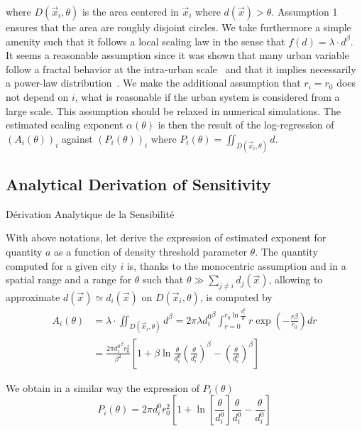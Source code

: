 where $D(\vec{x}_i, \theta)$ is the area centered in $\vec{x}_i$ where $d(\vec{x})>\theta$. Assumption 1 ensures that the area are roughly disjoint circles. We take furthermore a simple amenity such that it follows a local scaling law in the sense that $f(d)=\lambda\cdot d^\beta$. It seems a reasonable assumption since it was shown that many urban variable follow a fractal behavior at the intra-urban scale~\cite{keersmaecker2003using} and that it implies necessarily a power-law distribution~\cite{chen2010characterizing}. We make the additional assumption that $r_i=r_0$ does not depend on $i$, what is reasonable if the urban system is considered from a large scale. This assumption should be relaxed in numerical simulations. The estimated scaling exponent $\alpha(\theta)$ is then the result of the log-regression of $(A_i(\theta))_i$ against $(P_i(\theta))_i$ where $P_i(\theta)=\iint_{D(\vec{x}_i,\theta)}{d}$.


\subsection{Analytical Derivation of Sensitivity}{Dérivation Analytique de la Sensibilité}

With above notations, let derive the expression of estimated exponent for quantity $a$ as a function of density threshold parameter $\theta$. The quantity computed for a given city $i$ is, thanks to the monocentric assumption and in a spatial range and a range for $\theta$ such that $\theta \gg \sum_{j\neq i}{d_j(\vec{x})}$, allowing to approximate $d(\vec{x})\simeq d_i(\vec{x})$ on $D(\vec{x}_i,\theta)$, is computed by
\[
\begin{split}
A_i(\theta) & = \lambda\cdot \iint_{D(\vec{x}_i,\theta)}{d^\beta} = 2\pi\lambda {d_i^0}^{\beta} \int_{r=0}^{r_0 \ln{\frac{d_i^0}{\theta}}}{r\exp{\left(-\frac{r\beta}{r_0}\right)}dr}\\
& = \frac{2\pi {d_i^0}^\beta r_0^2}{\beta^2} \left[1 + \beta \ln{\frac{\theta}{d_i^0}\left(\frac{\theta}{d_i^0}\right)^\beta} - \left(\frac{\theta}{d_i^0}\right)^\beta\right]
\end{split}
\]

We obtain in a similar way the expression of $P_i(\theta)$
\[
P_i(\theta) = 2\pi d_i^0 r_0^2 \left[1 + \ln{\left[\frac{\theta}{d_i^0}\right]}\frac{\theta}{d_i^0} - \frac{\theta}{d_i^0}\right]
\]


